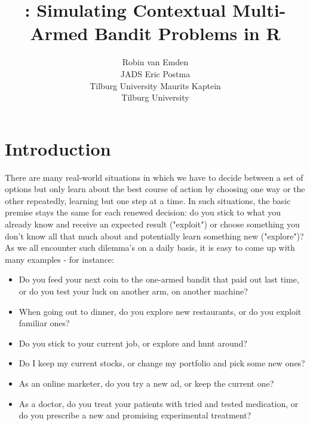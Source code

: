\documentclass[nojss]{jss}\usepackage[]{graphicx}\usepackage[]{color}
\author{Robin van Emden\\JADS \And
  Eric Postma\\Tilburg University \And
  Maurits Kaptein\\Tilburg University}
\title{\pkg{contextual}: Simulating Contextual Multi-Armed Bandit Problems in R}
\begin{document}
\sloppy







\section{Introduction}

There are many real-world situations in which we have to decide between a set of options but only learn about the best course of action by choosing one way or the other repeatedly, learning but one step at a time. In such situations, the basic premise stays the same for each renewed decision: do you stick to what you already know and receive an expected result ("exploit") or choose something you don't know all that much about and potentially learn something new ("explore")? As we all encounter such dilemma's on a daily basis, it is easy to come up with many examples - for instance:

\begin{itemize}
\item Do you feed your next coin to the one-armed bandit that paid out last time, or do you test your luck on another arm, on another machine?
\item When going out to dinner, do you explore new restaurants, or do you exploit familiar ones?
\item Do you stick to your current job, or explore and hunt around?
\item Do I keep my current stocks, or change my portfolio and pick some new ones?
\item As an online marketer, do you try a new ad, or keep the current one?
\item As a doctor, do you treat your patients with tried and tested medication, or do you prescribe a new and promising experimental treatment?
\end{itemize}
\end{document}
